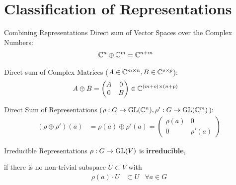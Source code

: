 
\section{Classification of Representations}

\begin{frame}{Combining Representations}
    \large
    Direct sum of Vector Spaces over the Complex Numbers:
    \pause
    \begin{align*}
        \mathbb{C}^n \oplus \mathbb{C}^m & = \mathbb{C}^{n + m}
    \end{align*}

    \pause
    Direct sum of Complex Matrices ($A \in \mathbb{C}^{m \times n}, B \in \mathbb{C}^{o \times p}$):
    \pause
    \begin{align*}
        A \oplus B & = \begin{pmatrix}
            A & 0 \\
            0 & B
        \end{pmatrix} \in \mathbb{C}^{(m + o) \times (n + p)}
    \end{align*}

    \pause
    Direct Sum of Representations ($\rho: G \to \operatorname{GL}(\mathbb{C}^n), \rho': G \to \operatorname{GL}(\mathbb{C}^m)$):
    \pause
    \begin{align*}
        (\rho \oplus \rho')(a) & = \rho(a) \oplus \rho'(a) = \begin{pmatrix}
            \rho(a) & 0 \\
            0 & \rho'(a)
        \end{pmatrix}
    \end{align*}

\end{frame}

\begin{frame}{Irreducible Representations}
    \large
    $\rho: G \to \operatorname{GL}(V)$ is \textbf{irreducible},
    
    \pause
    if there is no non-trivial subspace $U \subset V$ with
    \pause
    \begin{align*}
        \rho(a) \cdot U & \subset U & \forall a \in G
    \end{align*}

    \normalsize
    {\hspace*{\fill} \cite{hein2013}}

\end{frame}

